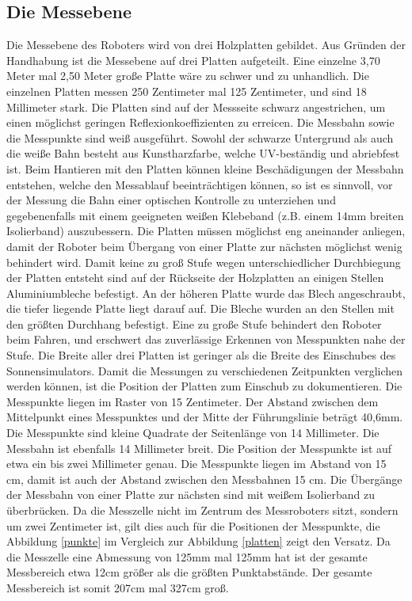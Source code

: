 \documentclass[a4paper,bibtotoc,oneside]{scrbook}
\begin{document}
\subsection{Die Messebene}\thispagestyle{empty}
Die Messebene des Roboters wird von drei Holzplatten gebildet. Aus Gründen der Handhabung ist die Messebene auf drei Platten aufgeteilt. Eine einzelne 3,70 Meter mal 2,50 Meter große Platte wäre zu schwer und zu unhandlich. Die einzelnen Platten messen 250 Zentimeter mal 125 Zentimeter, und sind 18 Millimeter stark.
Die Platten sind auf der Messseite schwarz angestrichen, um einen möglichst geringen Reflexionkoeffizienten zu erreicen. Die Messbahn sowie die Messpunkte sind weiß ausgeführt. Sowohl der schwarze Untergrund als auch die weiße Bahn besteht aus Kunstharzfarbe, welche UV-beständig und abriebfest ist. Beim Hantieren mit den Platten können kleine Beschädigungen der Messbahn entstehen, welche den Messablauf beeinträchtigen können, so ist es sinnvoll, vor der Messung die Bahn einer optischen Kontrolle zu unterziehen und gegebenenfalls mit einem geeigneten weißen Klebeband (z.B. einem 14mm breiten Isolierband) auszubessern.
Die Platten müssen möglichst eng aneinander anliegen, damit der Roboter beim Übergang von einer Platte zur nächsten möglichst wenig behindert wird. Damit keine zu groß Stufe wegen unterschiedlicher Durchbiegung der Platten entsteht sind auf der Rückseite der Holzplatten an einigen Stellen Aluminiumbleche befestigt. An der höheren Platte wurde das Blech angeschraubt, die tiefer liegende Platte liegt darauf auf. Die Bleche wurden an den Stellen mit den größten Durchhang befestigt.
Eine zu große Stufe behindert den Roboter beim Fahren, und erschwert das zuverlässige Erkennen von Messpunkten nahe der Stufe.
Die Breite aller drei Platten ist geringer als die Breite des Einschubes des Sonnensimulators. Damit die Messungen zu verschiedenen Zeitpunkten verglichen werden können, ist die Position der Platten zum Einschub zu dokumentieren.
Die Messpunkte liegen im Raster von 15 Zentimeter. Der Abstand zwischen dem Mittelpunkt eines Messpunktes und der Mitte der Führungslinie beträgt 40,6mm. Die Messpunkte sind kleine Quadrate der Seitenlänge von 14 Millimeter. Die Messbahn ist ebenfalls 14 Millimeter breit. Die Position der Messpunkte ist auf etwa ein bis zwei Millimeter genau.
Die Messpunkte liegen im Abstand von 15 cm, damit ist auch der Abstand zwischen den Messbahnen 15 cm. Die Übergänge der Messbahn von einer Platte zur nächsten sind mit weißem Isolierband zu überbrücken. 
Da die Messzelle nicht im Zentrum des Messroboters sitzt, sondern um zwei Zentimeter ist, gilt dies auch für die Positionen der Messpunkte, die Abbildung \ref{punkte} im Vergleich zur Abbildung \ref{platten} zeigt den Versatz.
Da die Messzelle eine Abmessung von 125mm mal 125mm hat ist der gesamte Messbereich etwa 12cm größer als die größten Punktabstände. Der gesamte Messbereich ist somit 207cm mal 327cm groß.
\end{document}
